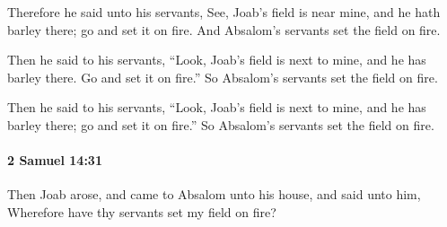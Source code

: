 			\begin{versebox}
					\item[BHS] 
					\item[ASV] Therefore he said unto his servants, See, Joab's field is near mine, and he hath barley there; go and set it on fire. And Absalom's servants set the field on fire.
					\item[NIV] Then he said to his servants, “Look, Joab’s field is next to mine, and he has barley there. Go and set it on fire.” So Absalom’s servants set the field on fire.
					\item[NRSV] Then he said to his servants, “Look, Joab’s field is next to mine, and he has barley there; go and set it on fire.” So Absalom’s servants set the field on fire.
			\end{versebox}

		\paragraph{2 Samuel 14:31} %
			\label{2SAMUEL-14-31}

			Then Joab arose, and came to Absalom unto his house, and said unto him, Wherefore have thy servants set my field on fire?

